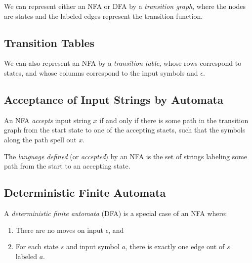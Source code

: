 \documentclass[12pt,a4paper,twoside,openany]{book}
\begin{document}
We can represent either an NFA or DFA by a \textit{transition graph}, where the nodes are states and the labeled edges represent the transition function.

\subsection{Transition Tables}

We can also represent an NFA by a \textit{transition table}, whose rows correspond to states, and whose columns correspond to the input symbols and $\epsilon$.

\subsection{Acceptance of Input Strings by Automata}

An NFA \textit{accepts} input string $x$ if and only if there is some path in the transition graph from the start state to one of the accepting staets, such that the symbols along the path spell out $x$.

The \textit{language defined} (or \textit{accepted}) by an NFA is the set of strings labeling some path from the start to an accepting state.

\subsection{Deterministic Finite Automata}

A \textit{deterministic finite automata} (DFA) is a special case of an NFA where:
\begin{enumerate}
    \item There are no moves on input $\epsilon$, and
    \item For each state $s$ and input symbol $a$, there is exactly one edge out of $s$ labeled $a$.
\end{enumerate}

\end{document}
